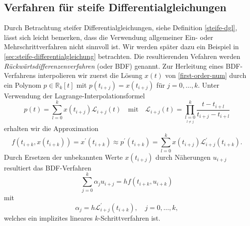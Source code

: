 \subsection{Verfahren für steife Differentialgleichungen}
Durch Betrachtung steifer Differentialgleichungen, siehe Definition \ref{steife-dgl}, lässt sich leicht bemerken, dass
die Verwendung allgemeiner Ein- oder Mehrschrittverfahren nicht sinnvoll ist. Wir werden später dazu ein Beispiel in
\ref{sec:steife-differentialgleichung} betrachten. Die resultierenden Vefahren werden
\textit{Rückwärtsdifferenzenverfahren} (oder BDF) genannt. Zur Herleitung eines BDF-Verfahrens interpolieren wir zuerst
die Lösung $x(t)$ von \eqref{first-order-num} durch ein Polynom $p \in \mathbb{R}_k[t]$ mit $p(t_{i+j}) = x(t_{i+j})$ für
$j=0, \dots, k$. Unter Verwendung der Lagrange-Interpolationsformel
\[
    p(t) = \sum_{l=0}^{k} x(t_{i+j}) \mathcal{L}_{i+j}(t) \quad \text{mit} \quad
    \mathcal{L}_{i+j}(t) = \prod\limits_{\underset{l \neq j}{l=0}}^{k} \frac{t-t_{i+l}}{t_{i+j}-t_{i+l}}
\]
erhalten wir die Approximation
\[
    f(t_{i+k},x(t_{i+k})) = x^{\prime}(t_{i+k}) \approx p^{\prime}(t_{i+k})
    = \sum_{l=0}^{k} x(t_{i+j})\mathcal{L}^{\prime}_{i+j}(t_{i+k}).
\]
Durch Ersetzen der unbekannten Werte $x(t_{i+j})$ durch Näherungen $u_{i+j}$ resultiert das BDF-Verfahren
\[
    \sum_{j=0}^{k}\alpha_j u_{i+j} = h f(t_{i+k}, u_{i+k})
\]
mit
\[
    \alpha_j = h \mathcal{L}^{\prime}_{i+j} (t_{i+k}), \quad j=0,\dots,k,
\]
welches ein implizites lineares $k$-Schrittverfahren ist.\\

